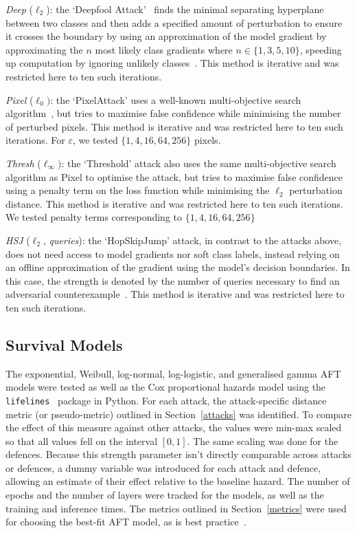 \textit{Deep} ($\ell_2$): the `Deepfool Attack'~\cite{deepfool} finds the minimal separating hyperplane between two classes and then adds a specified amount of perturbation to ensure it crosses the boundary by using an approximation of the model gradient by approximating the $n$ most likely class gradients where $n \in \{1,3,5,10\}$, speeding up computation by ignoring unlikely classes~\cite{deepfool}. 
This method is iterative and was restricted here to ten such iterations.

\textit{Pixel} ($\ell_{0})$: the `PixelAttack' uses a well-known multi-objective search algorithm~\cite{pixelattack}, but tries to maximise false confidence while minimising the number of perturbed pixels. 
This method is iterative and was restricted here to ten such iterations. For $\varepsilon$, we tested $\{
1,4,16,64,256
\}$ pixels.

\textit{Thresh} ($\ell_{\infty})$: the `Threshold' attack also uses the same multi-objective search algorithm as Pixel to optimise the attack, but tries to maximise false confidence using a penalty term on the loss function while minimising the $\ell_2$ perturbation distance. 
This method is iterative and was restricted here to ten such iterations. We tested penalty terms corresponding to $\{ 1,4,16,64,256\}$





\textit{HSJ} ($\ell_2$, \textit{queries}): the `HopSkipJump' attack, in contrast to the attacks above, does not need access to model gradients nor soft class labels, instead relying on an offline approximation of the gradient using the model's decision boundaries. 
In this case, the strength is denoted by the number of queries necessary to find an adversarial counterexample~\cite{hopskipjump}. 
This method is iterative and was restricted here to ten such iterations.

\subsection{Survival Models}
The exponential, Weibull, log-normal, log-logistic, and generalised gamma  AFT models were tested as well as the Cox proportional hazards model using the \texttt{lifelines}~\cite{lifelines} package in Python. 
For each attack, the attack-specific distance metric (or pseudo-metric) outlined in Section~\ref{attacks} was identified.
To compare the effect of this measure against other attacks, the values were min-max scaled so that all values fell on the interval $[0,1]$. The same scaling was done for the defences. 
Because this strength parameter isn't directly comparable across attacks or defences, a dummy variable was introduced for each attack and defence, allowing an estimate of their effect relative to the baseline hazard. 
The number of epochs and the number of layers were tracked for the models, as well as the training and inference times. 
The metrics outlined in Section~\ref{metrics} were used for choosing the best-fit AFT model, as is best practice~\cite{aft_models}. 
